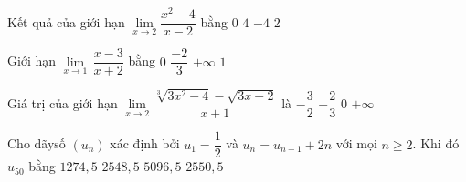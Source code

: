 \begin{ex}%
	Kết quả của giới hạn $\lim\limits_{x  \to 2}\dfrac{x^2-4}{x-2}$ bằng
	 \choice
		{$0$} 
		 {\True $4$}
		 {$-4$}
		{$2$} 
\end{ex}

\begin{ex}%
	Giới hạn  $\lim\limits_{x\to 1}\, \dfrac{x-3}{x+2}$ bằng
	\choice 
		{$0$} 
		{\True  $\dfrac{-2}{3}$}
		{$+\infty  $}
		 {$1$}
\end{ex}

\begin{ex}%
	 Giá trị của giới hạn $\lim\limits_{x\to 2}\dfrac{\sqrt[3]{3x^2-4}-\sqrt{3x-2}}{x+1}$ là
	\choice 
		 {$-\dfrac{3}{2}$}
		 {$-\dfrac{2}{3}$}
		{\True $0$} 
		 {$+\infty$}
\end{ex}

\begin{ex}%
	Cho dãysố $\left(u_n\right)$ xác định bởi $u_1=\dfrac{1}{2}$ và  $u_n={u}_{n-1}+2n$ với mọi $n\ge 2$. Khi đó $u_{50}$ bằng
	 \choice
		{$1274,5$} 
		{$2548,5$} 
		{$5096,5$} 
		 {\True $2550,5$}
\end{ex}

